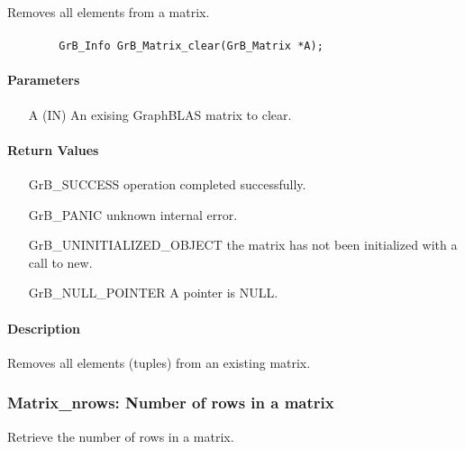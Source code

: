 Removes all elements from a matrix.

\paragraph{\syntax}

\begin{verbatim}
        GrB_Info GrB_Matrix_clear(GrB_Matrix *A);
\end{verbatim}

\paragraph{Parameters}

\begin{itemize}[leftmargin=1.1in]
    \item[{\sf A}] ({\sf IN}) An exising GraphBLAS matrix to clear.
\end{itemize}

\paragraph{Return Values}

\begin{itemize}[leftmargin=2.1in]
\item[{\sf GrB\_SUCCESS}]   operation completed successfully.
\item[{\sf GrB\_PANIC}]     unknown internal error.
\item[{\sf GrB\_UNINITIALIZED\_OBJECT}]  the matrix has not been initialized with a call to new.
\item[{\sf GrB\_NULL\_POINTER}]    {\sf A} pointer is {\sf NULL}.
\end{itemize}

\paragraph{Description}

Removes all elements (tuples) from an existing matrix.

\subsubsection{{\sf Matrix\_nrows}: Number of rows in a matrix}

Retrieve the number of rows in a matrix.

\paragraph{\syntax}

